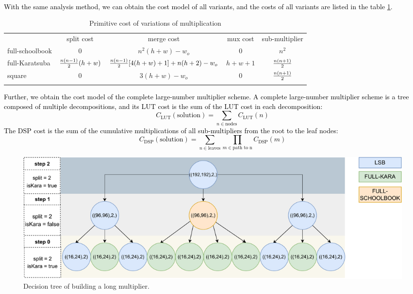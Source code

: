 \documentclass[conference]{IEEEtran}
\begin{document}
\textcolor{black}{
With the same analysis method, we can obtain the cost model of all variants, and the costs of all variants are listed in the table \ref{cost}.
}

\begin{table}[ht]
    \centering
    \caption{Primitive cost of variations of multiplication}
    \renewcommand{\arraystretch}{1.1}
    \begin{tabular}{l|c|c|c|c}
                \Xhline{1.5pt}
                        & split cost & merge cost & mux cost & sub-multiplier \\
                \Xhline{1pt}
        full-schoolbook &   0         & $n^2(h+w) - w_o$ &  0         &    $n^2$       \\
                \Xhline{1pt}
        full-Karatsuba  &   ${n(n-1)\over 2}(h+w)$        &     ${n(n-1)\over 2}[4(h+w)+1] + n(h+2) - w_o $       &    $h+w+1$       &     ${n(n+1)\over 2}$      \\
                \Xhline{1pt}
        square          &    0        &     $3(h+w) - w_o $       &   0        &     ${n(n+1)\over 2}$      \\
                \Xhline{1.5pt}    
    \end{tabular}
    \label{cost}
\end{table}

\textcolor{black}{
Further, we obtain the cost model of the complete large-number multiplier scheme. A complete large-number multiplier scheme is a tree composed of multiple decompositions, and its LUT cost is the sum of the LUT cost in each decomposition:
\begin{equation}
    C_{\text{LUT}}(\text{solution}) = \sum_{n\in \text{nodes}}C_{\text{LUT}}(n)
\end{equation}
The DSP cost is the sum of the cumulative multiplications of all sub-multipliers from the root to the leaf nodes:
\begin{equation}
    C_{\text{DSP}}(\text{solution}) = \sum_{n\in \text{leaves}}\prod _{m \in \text{path to n}}C_{\text{DSP}}(m)
\end{equation}
}


\begin{figure}[htb]   %
	\centering
	\includegraphics[width=\linewidth,scale=1.00]{fig8.pdf}    %
	\caption{Decision tree of building a long multiplier.}
	\label{Figure8}
\end{figure}
\end{document}
